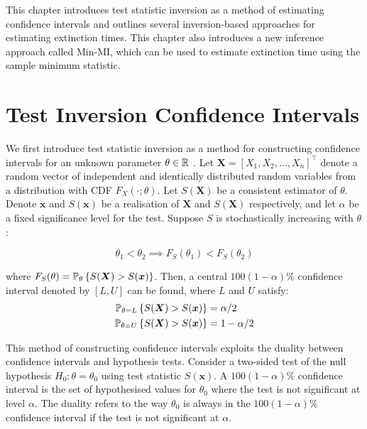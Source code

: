 
This chapter introduces test statistic inversion as a method of estimating confidence intervals and outlines several inversion-based approaches for estimating extinction times. This chapter also introduces a new inference approach called Min-MI, which can be used to estimate extinction time using the sample minimum statistic.

\section{Test Inversion Confidence Intervals}

We first introduce test statistic inversion as a method for constructing confidence intervals for an unknown parameter $\theta \in \mathbb{R}$ \parencite{Carpenter1999}. Let $\bm{X} = [X_1, X_2, \dots, X_n]^\top$ denote a random vector of independent and identically distributed random variables from a distribution with CDF $F_X (\cdot; \theta)$. Let $S(\bm{X})$ be a consistent estimator of $\theta$. Denote $\bm{x}$ and $S(\bm{x})$ be a realisation of $\bm{X}$ and $S(\bm{X})$ respectively, and let $\alpha$ be a fixed significance level for the test. Suppose $S$ is stochastically increasing with $\theta$:

\begin{equation}
    \theta_1 < \theta_2 \implies F_S(\theta_1) < F_S(\theta_2) 
\end{equation}

where $F_S(\theta) = \mathbb{P}_\theta\left\{S(\bm{X}) > S(\bm{x})\right\}$. Then, a central $100(1-\alpha)\%$ confidence interval denoted by $[L, U]$ can be found, where $L$ and $U$ satisfy: \begin{equation}
\begin{aligned}
    \mathbb{P}_{\theta = L}\left\{S(\bm{X}) > S(\bm{x})\right\} &= \alpha/2 \\
    \mathbb{P}_{\theta = U}\left\{S(\bm{X}) > S(\bm{x})\right\} &= 1 - \alpha/2
\end{aligned}
\end{equation}

This method of constructing confidence intervals exploits the duality between confidence intervals and hypothesis tests. Consider a two-sided test of the null hypothesis $H_0: \theta = \theta_0$ using test statistic $S(\bm{x})$. A $100(1-\alpha)\%$ confidence interval is the set of hypothesised values for $\theta_0$ where the test is not significant at level $\alpha$. The duality refers to the way $\theta_0$ is always in the $100(1-\alpha)\%$ confidence interval if the test is not significant at $\alpha$.

